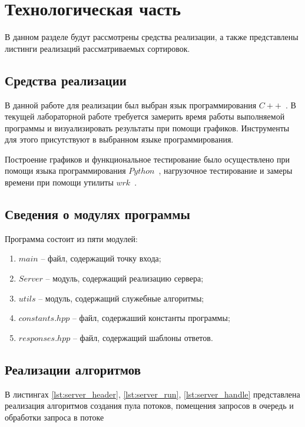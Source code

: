\chapter{Технологическая часть}

В данном разделе будут рассмотрены средства реализации, а также представлены листинги реализаций рассматриваемых сортировок.

\section{Средства реализации}
В данной работе для реализации был выбран язык программирования $C++$~\cite{cpp-lang}. В текущей лабораторной работе требуется замерить время работы выполняемой программы
и визуализировать результаты при помощи графиков. Инструменты для этого присутствуют в выбранном языке программирования.

Построение графиков и функциональное тестирование было осуществлено при помощи языка программирования $Python$~\cite{python-lang}, нагрузочное тестирование и замеры времени при помощи утилиты $wrk$~\cite{wrk}.

\section{Сведения о модулях программы}
Программа состоит из пяти модулей:
\begin{enumerate}[label=\arabic*)]
	\item $main$ -- файл, содержащий точку входа;
	\item $Server$ -- модуль, содержащий реализацию сервера;
	\item $utils$ -- модуль, содержащий служебные алгоритмы;
	\item $constants.hpp$ -- файл, содержаший константы программы;
	\item $responses.hpp$ -- файл, содержащий шаблоны ответов. \newline
\end{enumerate}


\section{Реализации алгоритмов}

В листингах \ref{lst:server_header}, \ref{lst:server_run}, \ref{lst:server_handle} представлена реализация алгоритмов создания пула потоков, помещения запросов в очередь и обработки запроса в потоке\clearpage

